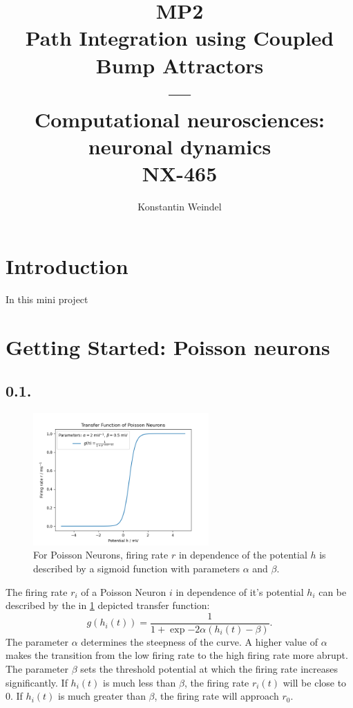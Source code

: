 \documentclass{article}
\title{MP2\\Path Integration using Coupled Bump Attractors\\---\\Computational neurosciences: neuronal dynamics\\NX-465}
\author{Konstantin Weindel}
\begin{document}
\maketitle


\section*{Introduction}
In this mini project 

\section{Getting Started: Poisson neurons}
\subsection*{0.1.}
\begin{figure}[h]
    \centering
    \includegraphics[width=0.6\textwidth]{figures/0.1.transfer_function.png}
    \caption{For Poisson Neurons, firing rate \(r\) in dependence of the potential \(h\) is described by a sigmoid function with parameters \(\alpha\) and \(\beta\).}
    \label{fig:01}
\end{figure}

The firing rate \(r_i\) of a Poisson Neuron \(i\) in dependence of it's potential \(h_i\) can be described by the in \cref{fig:01} depicted transfer function:
\[g(h_i(t)) = \frac{1}{1+\exp{-2\alpha(h_i(t)-\beta)}}.\]
The parameter $\alpha$ determines the steepness of the curve. A higher value of $\alpha$ makes the transition from the low firing rate to the high firing rate more abrupt.
The parameter $\beta$ sets the threshold potential at which the firing rate increases significantly. If $h_i(t)$ is much less than $\beta$, the firing rate $r_i(t)$ will be close to 0. If $h_i(t)$ is much greater than $\beta$, the firing rate will approach $r_0$.
\end{document}
